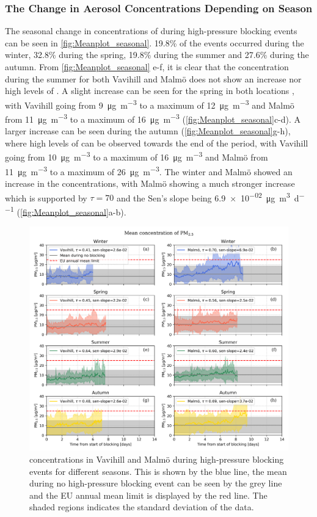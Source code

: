 \subsubsection{The Change in Aerosol Concentrations Depending on Season}
The seasonal change in concentrations of \PM during high-pressure blocking events can be seen in \autoref{fig:Meanplot_seasonal}. 19.8\% of the events occurred during the winter, 32.8\% during the spring, 19.8\% during the summer and 27.6\% during the autumn. From \autoref{fig:Meanplot_seasonal} e-f, it is clear that the concentration during the summer for both Vavihill and Malmö does not show an increase nor high levels of \PM. A slight increase can be seen for the spring in both locations , with Vavihill going from \SI{9}{\micro\gram\per\meter\cubed} to a maximum of \SI{12}{\micro\gram\per\meter\cubed} and Malmö from \SI{11}{\micro\gram\per\meter\cubed} to a maximum of \SI{16}{\micro\gram\per\meter\cubed} (\autoref{fig:Meanplot_seasonal}c-d). A larger increase can be seen during the autumn (\autoref{fig:Meanplot_seasonal}g-h), where high levels of \PM can be observed towards the end of the period, with Vavihill going from \SI{10}{\micro\gram\per\meter\cubed} to a maximum of \SI{16}{\micro\gram\per\meter\cubed} and Malmö from \SI{11}{\micro\gram\per\meter\cubed} to a maximum of \SI{26}{\micro\gram\per\meter\cubed}. The winter and Malmö showed an increase in the \PM concentrations, with Malmö showing a much stronger increase which is supported by $\tau=70$ and the Sen's slope being \SI{6.9e-02}{\micro\gram\per\meter\cubed\per\day} (\autoref{fig:Meanplot_seasonal}a-b). 

\begin{figure}[H]
    \centering
    \includegraphics[width=\textwidth]{Figures/Meanplot_seasonal.png}
    \caption{\PM concentrations in Vavihill and Malmö during high-pressure blocking events for different seasons. This is shown by the blue line, the mean during no high-pressure blocking event can be seen by the grey line and the EU annual mean limit is displayed by the red line. The shaded regions indicates the standard deviation of the data.}
    \label{fig:Meanplot_seasonal}
\end{figure}
 
